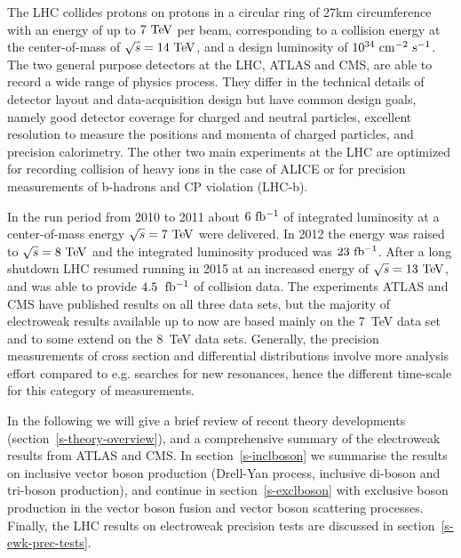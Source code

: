 The LHC collides protons on protons in a circular ring of 27\;km
circumference with an energy of up to $7\TeV$ per beam, corresponding
to a collision energy at the center-of-mass of $\rts=14\TeV$, and a
design luminosity of $10^{34}\cm^{-2}\s^{-1}$.
The two general purpose detectors at the LHC, ATLAS and CMS, are able
to record a wide range of physics process. They differ in the
technical details of detector layout and data-acquisition design but
have common design goals, namely good detector coverage for charged
and neutral particles, excellent resolution to measure the positions
and momenta of charged particles, and precision calorimetry. The other
two main experiments at the LHC are optimized for recording collision
of heavy ions in the case of ALICE or for precision measurements of
b-hadrons and CP violation (LHC-b).

In the run period from 2010 to 2011 about $6\mbox{\ fb$^{-1}$}$ of integrated
luminosity at a center-of-mass energy $\rts=7\TeV$ were delivered. In
2012 the energy was raised to $\rts=8\TeV$ and the integrated
luminosity produced was $23\mbox{\ fb$^{-1}$}$.  After a long shutdown LHC resumed
running in 2015 at an increased energy of $\rts=13\TeV$, and was able
to provide $4.5\;\mbox{\ fb$^{-1}$}$ of collision data.  The experiments ATLAS and
CMS have published results on all three data sets, but the majority of
electroweak results available up to now are based mainly on the 7~TeV
data set and to some extend on the 8~TeV data sets. Generally, the
precision measurements of cross section and differential distributions
involve more analysis effort compared to e.g. searches for new
resonances, hence the different time-scale for this category of
measurements.






In the following we will give a brief review
of recent theory developments (section~\ref{s-theory-overview}), and a
comprehensive summary of the electroweak results from ATLAS and
CMS. In section~\ref{s-inclboson} we summarise the results on
inclusive vector boson production (Drell-Yan process, inclusive
di-boson and tri-boson production), and continue in
section~\ref{s-exclboson} with exclusive boson production in the
vector boson fusion and vector boson scattering processes. Finally,
the LHC results on electroweak precision tests are discussed in
section~\ref{s-ewk-prec-tests}.


